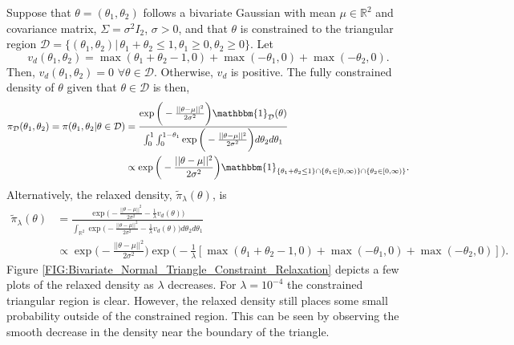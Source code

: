 \documentclass[10pt,fleqn]{article}
\DeclareMathOperator{\1}{\mathbbm{1}}
\begin{document}
Suppose that $\theta = (\theta_1,\theta_2)$ follows a bivariate Gaussian with mean $\mu \in\mathbb{R}^2$ and covariance matrix, $\Sigma = \sigma^2 I_2$, $\sigma > 0$, and that $\theta$  is constrained to the triangular region $\mathcal{D} = \{(\theta_1,\theta_2) | \, \theta_1+\theta_2\le 1, \theta_1\ge0, \theta_2 \ge 0\}.$ Let $$v_d(\theta_1,\theta_2) = \max(\theta_1+\theta_2 -1,0) + \max(-\theta_1,0) + \max(-\theta_2,0).$$
Then, $v_d(\theta_1,\theta_2) = 0$ $\forall \theta\in\mathcal{D}$. Otherwise, $v_d$ is positive.  The fully constrained density of $\theta$ given that $\theta\in \mathcal{D}$ is then,
\begin{align*}
\pi_\mathcal{D}(\theta_1,\theta_2)= \pi(\theta_1,\theta_2|\theta\in\mathcal{D})&= \frac{\exp\bigg(-\frac{||\theta-\mu||^2}{2\sigma^2}\bigg)\mathbbm{1}_\mathcal{D}(\theta)}{\int_0^1\int_0^{1-\theta_1}\exp\bigg(-\frac{||\theta-\mu||^2}{2\sigma^2}\bigg)d\theta_2d\theta_1}\\
&\propto \exp\bigg(-\frac{||\theta-\mu||^2}{2\sigma^2}\bigg) \mathbbm{1}_{\{\theta_1+\theta_2\le 1\}\cap \{\theta_1 \in [0,\infty)\}\cap \{\theta_2\in[0,\infty)\}} .
\end{align*}
Alternatively, the relaxed density, $\tilde{\pi}_\lambda(\theta)$, is
\begin{equation}
\begin{split}
\tilde{\pi}_\lambda(\theta) &=\frac{\exp\bigg(-\frac{||\theta-\mu||^2}{2\sigma^2} - \frac{1}{\lambda}v_d(\theta) \bigg)}{\int_{\mathbb{R}^2} \exp\bigg(-\frac{||\theta-\mu||^2}{2\sigma^2}-\frac{1}{\lambda}v_d(\theta) \bigg)d\theta_2d\theta_1}\\
& \propto \exp\bigg(-\frac{||\theta-\mu||^2}{2\sigma^2}\bigg)\exp\bigg( - \frac{1}{\lambda}[\max(\theta_1+\theta_2 -1,0) + \max(-\theta_1,0) + \max(-\theta_2,0)] \bigg).
\end{split}
\label{EQ:Relaxed_Density_Bivariate_Normal_Triangle}
\end{equation}
Figure \ref{FIG:Bivariate_Normal_Triangle_Constraint_Relaxation} depicts a few plots of the relaxed density as $\lambda$ decreases.  For $\lambda=10^{-4}$ the constrained triangular region is clear. However, the relaxed density still places some small probability outside of the constrained region. This can be seen by observing the smooth decrease in the density near the boundary of the triangle.
\end{document}
